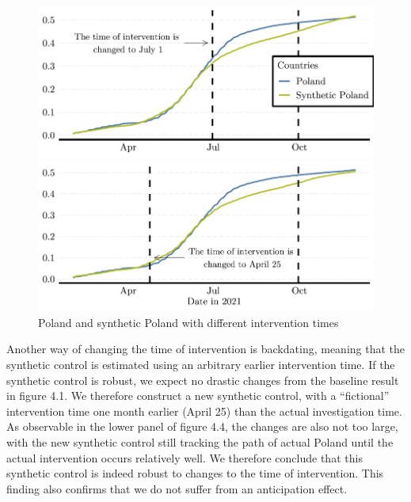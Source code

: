 \documentclass{scrbook}
\begin{document}
\begin{figure}[h]
\caption{Poland and synthetic Poland with different intervention times}

\begin{center}\includegraphics{bachelor_thesis_files/figure-latex/unnamed-chunk-5-1} \end{center}



\begin{center}\includegraphics{bachelor_thesis_files/figure-latex/unnamed-chunk-5-2} \end{center}
\end{figure}

Another way of changing the time of intervention is backdating, meaning
that the synthetic control is estimated using an arbitrary earlier
intervention time. If the synthetic control is robust, we expect no
drastic changes from the baseline result in figure 4.1. We therefore
construct a new synthetic control, with a ``fictional'' intervention
time one month earlier (April 25) than the actual investigation time. As
observable in the lower panel of figure 4.4, the changes are also not
too large, with the new synthetic control still tracking the path of
actual Poland until the actual intervention occurs relatively well. We
therefore conclude that this synthetic control is indeed robust to
changes to the time of intervention. This finding also confirms that we
do not suffer from an anticipation effect.
\end{document}
